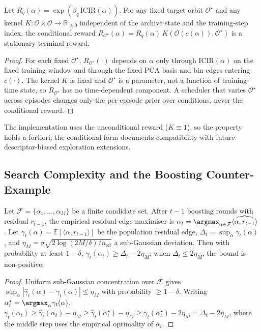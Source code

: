 \begin{theorem}
\label{app:thm_stationary}
Let $R_q(\alpha)=\exp(\beta_q\,\mathrm{ICIR}(\alpha))$. For any fixed target orbit $\mathcal{O}^\star$ and any kernel $K:\mathcal{O}\times\mathcal{O}\to\mathbb{R}_{\ge 0}$ independent of the archive state and the training-step index, the conditional reward $R_{\mathcal{O}^\star}(\alpha)=R_q(\alpha)\,K(\mathcal{O}(c(\alpha)),\mathcal{O}^\star)$ is a stationary terminal reward.
\end{theorem}
\begin{proof}
For each fixed $\mathcal{O}^\star$, $R_{\mathcal{O}^\star}(\cdot)$ depends on $\alpha$ only through $\mathrm{ICIR}(\alpha)$ on the fixed training window and through the fixed PCA basis and bin edges entering $c(\cdot)$. The kernel $K$ is fixed and $\mathcal{O}^\star$ is a parameter, not a function of training-time state, so $R_{\mathcal{O}^\star}$ has no time-dependent component. A scheduler that varies $\mathcal{O}^\star$ across episodes changes only the per-episode prior over conditions, never the conditional reward.
\end{proof}

The implementation uses the unconditional reward ($K\equiv 1$), so the property holds a fortiori; the conditional form documents compatibility with future descriptor-biased exploration extensions.

\subsection{Search Complexity and the Boosting Counter-Example}
\label{app:alphaqd_complexity}

\begin{theorem}
\label{app:thm_boost}
Let $\mathcal{F}=\{\alpha_1,\dots,\alpha_M\}$ be a finite candidate set. After $t-1$ boosting rounds with residual $r_{t-1}$, the empirical residual-edge maximiser is $\alpha_t=\argmax_{\alpha\in\mathcal{F}}\widehat{\langle\alpha,r_{t-1}\rangle}$. Let $\gamma_t(\alpha)=\mathbb{E}[\langle\alpha,r_{t-1}\rangle]$ be the population residual edge, $\Delta_t=\sup_\alpha\gamma_t(\alpha)$, and $\eta_M=\sigma\sqrt{2\log(2M/\delta)/n_{\mathrm{eff}}}$ a sub-Gaussian deviation. Then with probability at least $1-\delta$, $\gamma_t(\alpha_t)\ge\Delta_t-2\eta_M$; when $\Delta_t\le 2\eta_M$, the bound is non-positive.
\end{theorem}
\begin{proof}
Uniform sub-Gaussian concentration over $\mathcal{F}$ gives $\sup_\alpha|\hat\gamma_t(\alpha)-\gamma_t(\alpha)|\le\eta_M$ with probability $\ge 1-\delta$. Writing $\alpha_t^\star=\argmax_\alpha\gamma_t(\alpha)$, $\gamma_t(\alpha_t)\ge\hat\gamma_t(\alpha_t)-\eta_M\ge\hat\gamma_t(\alpha_t^\star)-\eta_M\ge\gamma_t(\alpha_t^\star)-2\eta_M=\Delta_t-2\eta_M$, where the middle step uses the empirical optimality of $\alpha_t$.
\end{proof}

